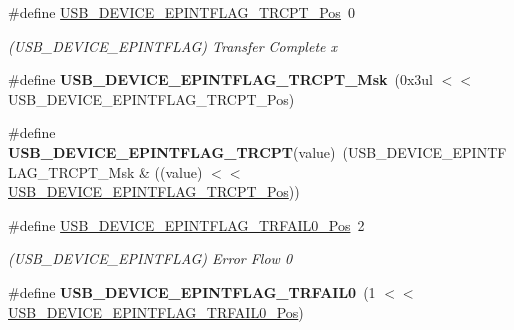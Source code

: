 \begin{DoxyCompactItemize}
\item 
\hypertarget{group___s_a_m_l21___u_s_b_ga73d5e8d8d7a40178d9fe0f614dcee874}{}\#define \hyperlink{group___s_a_m_l21___u_s_b_ga73d5e8d8d7a40178d9fe0f614dcee874}{U\+S\+B\+\_\+\+D\+E\+V\+I\+C\+E\+\_\+\+E\+P\+I\+N\+T\+F\+L\+A\+G\+\_\+\+T\+R\+C\+P\+T\+\_\+\+Pos}~0\label{group___s_a_m_l21___u_s_b_ga73d5e8d8d7a40178d9fe0f614dcee874}

\begin{DoxyCompactList}\small\item\em (U\+S\+B\+\_\+\+D\+E\+V\+I\+C\+E\+\_\+\+E\+P\+I\+N\+T\+F\+L\+A\+G) Transfer Complete x \end{DoxyCompactList}\item 
\hypertarget{group___s_a_m_l21___u_s_b_gaeca0559286c834d1b92627012fbfb157}{}\#define {\bfseries U\+S\+B\+\_\+\+D\+E\+V\+I\+C\+E\+\_\+\+E\+P\+I\+N\+T\+F\+L\+A\+G\+\_\+\+T\+R\+C\+P\+T\+\_\+\+Msk}~(0x3ul $<$$<$ U\+S\+B\+\_\+\+D\+E\+V\+I\+C\+E\+\_\+\+E\+P\+I\+N\+T\+F\+L\+A\+G\+\_\+\+T\+R\+C\+P\+T\+\_\+\+Pos)\label{group___s_a_m_l21___u_s_b_gaeca0559286c834d1b92627012fbfb157}

\item 
\hypertarget{group___s_a_m_l21___u_s_b_gad85cbc7fdff29eb7d31662d45c07bb40}{}\#define {\bfseries U\+S\+B\+\_\+\+D\+E\+V\+I\+C\+E\+\_\+\+E\+P\+I\+N\+T\+F\+L\+A\+G\+\_\+\+T\+R\+C\+P\+T}(value)~(U\+S\+B\+\_\+\+D\+E\+V\+I\+C\+E\+\_\+\+E\+P\+I\+N\+T\+F\+L\+A\+G\+\_\+\+T\+R\+C\+P\+T\+\_\+\+Msk \& ((value) $<$$<$ \hyperlink{group___s_a_m_l21___u_s_b_ga73d5e8d8d7a40178d9fe0f614dcee874}{U\+S\+B\+\_\+\+D\+E\+V\+I\+C\+E\+\_\+\+E\+P\+I\+N\+T\+F\+L\+A\+G\+\_\+\+T\+R\+C\+P\+T\+\_\+\+Pos}))\label{group___s_a_m_l21___u_s_b_gad85cbc7fdff29eb7d31662d45c07bb40}

\item 
\hypertarget{group___s_a_m_l21___u_s_b_gaabd62da03c34c9ed903fccf9eea5c067}{}\#define \hyperlink{group___s_a_m_l21___u_s_b_gaabd62da03c34c9ed903fccf9eea5c067}{U\+S\+B\+\_\+\+D\+E\+V\+I\+C\+E\+\_\+\+E\+P\+I\+N\+T\+F\+L\+A\+G\+\_\+\+T\+R\+F\+A\+I\+L0\+\_\+\+Pos}~2\label{group___s_a_m_l21___u_s_b_gaabd62da03c34c9ed903fccf9eea5c067}

\begin{DoxyCompactList}\small\item\em (U\+S\+B\+\_\+\+D\+E\+V\+I\+C\+E\+\_\+\+E\+P\+I\+N\+T\+F\+L\+A\+G) Error Flow 0 \end{DoxyCompactList}\item 
\hypertarget{group___s_a_m_l21___u_s_b_ga74d91dd6a8100e5c5df77735f9075947}{}\#define {\bfseries U\+S\+B\+\_\+\+D\+E\+V\+I\+C\+E\+\_\+\+E\+P\+I\+N\+T\+F\+L\+A\+G\+\_\+\+T\+R\+F\+A\+I\+L0}~(1 $<$$<$ \hyperlink{group___s_a_m_l21___u_s_b_gaabd62da03c34c9ed903fccf9eea5c067}{U\+S\+B\+\_\+\+D\+E\+V\+I\+C\+E\+\_\+\+E\+P\+I\+N\+T\+F\+L\+A\+G\+\_\+\+T\+R\+F\+A\+I\+L0\+\_\+\+Pos})\label{group___s_a_m_l21___u_s_b_ga74d91dd6a8100e5c5df77735f9075947}


\end{DoxyCompactItemize}
